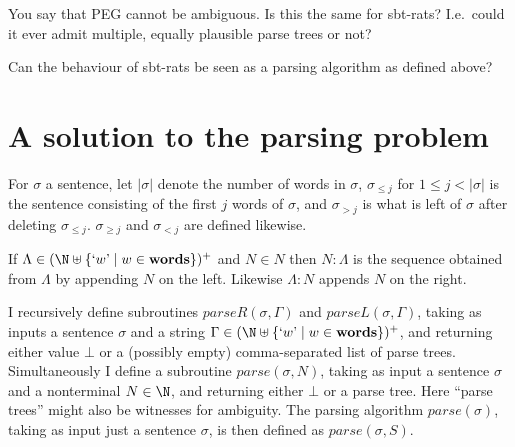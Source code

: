 \documentclass[adraft]{eptcs}
\begin{document}
You say that PEG cannot be ambiguous. Is this the same for sbt-rats? I.e.\ could it ever admit
multiple, equally plausible parse trees or not?

Can the behaviour of sbt-rats be seen as a parsing algorithm as defined above?

\section{A solution to the parsing problem}

For $\sigma$ a sentence, let $|\sigma|$ denote the number of words in $\sigma$,
$\sigma_{\leq j}$ for $1 \leq j < |\sigma|$ is the sentence consisting of the first $j$
words of $\sigma$, and $\sigma_{>j}$ is what is left of $\sigma$ after deleting $\sigma_{\leq j}$.
$\sigma_{\geq j}$ and $\sigma_{< j}$ are defined likewise.

If $\Lambda  \in (\N \uplus \{`w\mbox{'}\mid w \in \textbf{words}\})^+$ and $N \in N$ then
$N:\Lambda$ is the sequence obtained from $\Lambda$ by appending $N$ on the left.
Likewise $\Lambda:N$ appends $N$ on the right.

I recursively define subroutines $\textit{parseR}(\sigma,\Gamma)$ and $\textit{parseL}(\sigma,\Gamma)$,
taking as inputs a sentence $\sigma$ and a string $\Gamma \in (\N \uplus \{`w\mbox{'}\mid w \in \textbf{words}\})^+$,
and returning either value $\bot$ or a (possibly empty) comma-separated list of parse trees.
Simultaneously I define a subroutine  $\textit{parse}(\sigma,N)$, taking as input a sentence $\sigma$
and a nonterminal $N\in\N$, and returning either $\bot$ or a parse tree.
Here ``parse trees'' might also be witnesses for ambiguity.
The parsing algorithm $\textit{parse}(\sigma)$, taking as input just a sentence $\sigma$, is then
defined as $\textit{parse}(\sigma,S)$.
\vspace{2ex}
\end{document}

